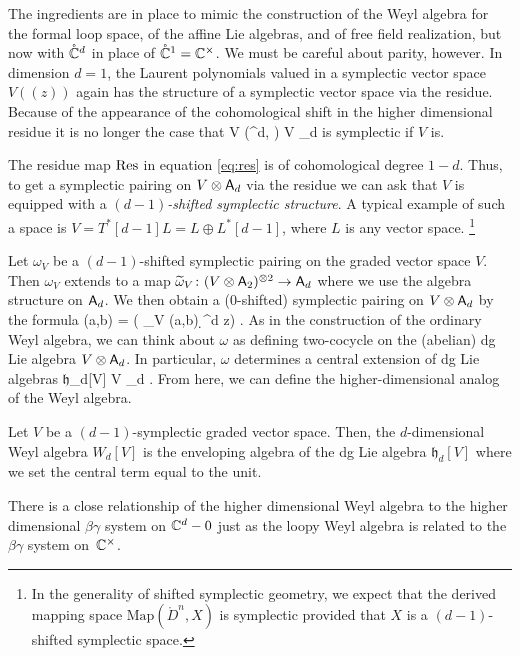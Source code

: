 \documentclass[11pt]{amsart}
\def\til{\Tilde}
\def\lie#1{\ensuremath{\mathfrak{#1}}}
\begin{document}
The ingredients are in place to mimic the construction of the Weyl algebra for the formal loop space, of the affine Lie algebras, and of free field realization, but now with $\mathring{\mathbb C}^d$ in place of $\mathring{\mathbb C}^1 = \mathbb C^\times$.
We must be careful about parity, however. 
In dimension $d = 1$, the Laurent polynomials valued in a symplectic vector space $V((z))$ again has the structure of a symplectic vector space via the residue. 
Because of the appearance of the cohomological shift in the higher dimensional residue it is no longer the case that 
\beqn
V \otimes \RR\Gamma(^d, \cO) \simeq V \otimes \sfA_d
\eeqn
is symplectic if $V$ is.

The residue map ${\rm Res}$ in equation \eqref{eq:res} is of cohomological degree $1-d$. 
Thus, to get a symplectic pairing on $V \otimes \mathsf A_d$ via the residue we can ask that $V$ is equipped with a {\em $(d-1)$-shifted symplectic structure}. 
A typical example of such a space is $V = T^*[d-1] L = L \oplus L^*[d-1]$, where $L$ is any vector space.
\footnote{In the generality of shifted symplectic geometry, we expect that the derived mapping space $\text{Map}(\mathring{D}^n, X)$ is symplectic provided that $X$ is a $(d-1)$-shifted symplectic space.}

Let $\omega_V$ be a $(d-1)$-shifted symplectic pairing on the graded vector space $V$. 
Then $\omega_V$ extends to a map $\til \omega_V \colon (V \otimes \sfA_2)^{\otimes 2} \to \sfA_d$ where we use the algebra structure on $\mathsf A_d$. 
We then obtain a ($0$-shifted) symplectic pairing on $V \otimes \mathsf A_d$ by the formula
\beqn
\label{eqn:omega}
\omega(a,b) = \Res ( \til \omega_V (a,b) \wedge \d^d z) .
\eeqn
As in the construction of the ordinary Weyl algebra, we can think about $\omega$ as defining two-cocycle on the (abelian) dg Lie algebra $V \otimes \mathsf A_d$.
In particular, $\omega$ determines a central extension of dg Lie algebras
\beqn
\CC \to \lie{h}_d[V] \to V \otimes \sfA_d .
\eeqn
From here, we can define the higher-dimensional analog of the Weyl algebra. 

\begin{dfn}
Let $V$ be a $(d-1)$-symplectic graded vector space. 
Then, the $d$-dimensional Weyl algebra $W_d[V]$ is the enveloping algebra of the dg Lie algebra $\lie{h}_d [V]$ where we set the central term equal to the unit.
\end{dfn}

There is a close relationship of the higher dimensional Weyl algebra to the higher dimensional $\beta\gamma$ system on $\mathbb C^d - 0$ just as the loopy Weyl algebra is related to the $\beta\gamma$ system on~$\mathbb C^\times$. 
\end{document}
